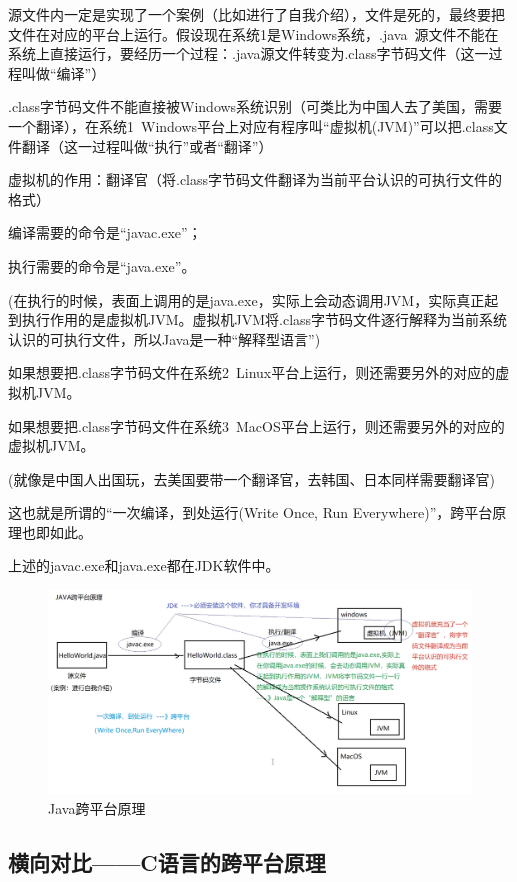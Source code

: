 \documentclass{article}
\begin{document}
	源文件内一定是实现了一个案例（比如进行了自我介绍），文件是死的，最终要把文件在对应的平台上运行。假设现在系统1是Windows系统，.java\ 源文件不能在系统上直接运行，要经历一个过程：.java源文件转变为.class字节码文件（这一过程叫做“编译”）
	
	.class字节码文件不能直接被Windows系统识别（可类比为中国人去了美国，需要一个翻译），在系统1\ Windows平台上对应有程序叫“虚拟机(JVM)”可以把.class文件翻译（这一过程叫做“执行”或者“翻译”）

	虚拟机的作用：翻译官（将.class字节码文件翻译为当前平台认识的可执行文件的格式）
	
	编译需要的命令是“javac.exe”；
	
	执行需要的命令是“java.exe”。
	
	(在执行的时候，表面上调用的是java.exe，实际上会动态调用JVM，实际真正起到执行作用的是虚拟机JVM。虚拟机JVM将.class字节码文件逐行解释为当前系统认识的可执行文件，所以Java是一种“解释型语言”)
	
	如果想要把.class字节码文件在系统2\ Linux平台上运行，则还需要另外的对应的虚拟机JVM。
	
	如果想要把.class字节码文件在系统3\ MacOS平台上运行，则还需要另外的对应的虚拟机JVM。
	
	(就像是中国人出国玩，去美国要带一个翻译官，去韩国、日本同样需要翻译官)
	
	这也就是所谓的“一次编译，到处运行(Write Once, Run Everywhere)”，跨平台原理也即如此。
	
	上述的javac.exe和java.exe都在JDK软件中。
	
	\begin{figure}[ht]
		\centering
		\includegraphics[width=180mm]{3.png}
		\caption{Java跨平台原理}
		\label{fig:label}
	\end{figure}	

	\subsection{横向对比——C语言的跨平台原理}
	
\end{document}
